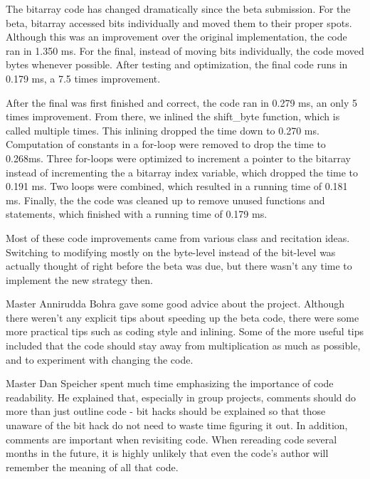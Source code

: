 \documentclass[12pt]{article}
\begin{document}
\maketitle

The bitarray code has changed dramatically since the beta submission.  For the 
beta, bitarray accessed bits individually and moved them to their proper spots.  
Although this was an improvement over the original implementation, the code ran
in 1.350 ms.  For the final, instead of moving bits individually, the code moved bytes
whenever possible. After testing and optimization, the final code runs in 0.179 ms, a 7.5 times improvement.  

After the final was first finished and correct, the code ran in 0.279 ms, an 
only 5 times improvement.  From there, we inlined the shift\_byte function, which
is called multiple times.  This inlining dropped the time down to 0.270 ms. 
Computation of constants in a for-loop were removed to drop the time to 0.268ms.
Three for-loops were optimized to increment a pointer to the bitarray instead of
incrementing the a bitarray index variable, which dropped the time to 0.191 ms.  Two loops were combined, which 
resulted in a running time of 0.181 ms. Finally, the the code was cleaned up to remove
unused functions and statements, which finished with a running time of 0.179 ms.  

Most of these code improvements came from various class and recitation ideas.  
Switching to modifying mostly on the byte-level instead of the bit-level was actually 
thought of right before the beta was due, but there wasn't any time to implement 
the new strategy then.

Master Annirudda Bohra gave some good advice about the project.  Although there 
weren't any explicit tips about speeding up the beta code, there were some 
more practical tips such as coding style and inlining.  Some of the more useful 
tips included that the code should stay away from multiplication as much as possible, 
and to experiment with changing the code. 

Master Dan Speicher spent much time emphasizing the importance of code readability. 
He explained that, especially in group projects, comments should
do more than just outline code - bit hacks should be explained so that those unaware
of the bit hack do not need to waste time figuring it out. In addition, comments
are important when revisiting code. When rereading code several months in the future, it is highly
unlikely that even the code's author will remember the meaning of all that code.
\end{document}

